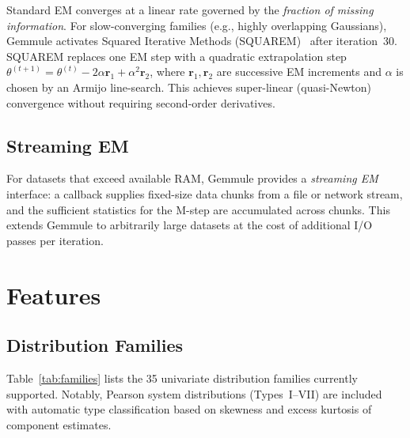 ﻿\documentclass[10pt,twocolumn]{article}
\begin{document}
Standard EM converges at a linear rate governed by the \emph{fraction of
missing information}.
For slow-converging families (e.g., highly overlapping Gaussians),
Gemmule activates Squared Iterative Methods
(SQUAREM)~\citep{varadhan2008squarem} after iteration~30.
SQUAREM replaces one EM step with a quadratic extrapolation step
$\theta^{(t+1)} = \theta^{(t)} - 2\alpha \mathbf{r}_1 + \alpha^2 \mathbf{r}_2$,
where $\mathbf{r}_1, \mathbf{r}_2$ are successive EM increments and
$\alpha$ is chosen by an Armijo line-search.
This achieves super-linear (quasi-Newton) convergence without requiring
second-order derivatives.

\subsection{Streaming EM}

For datasets that exceed available RAM, Gemmule provides a \emph{streaming
EM} interface: a callback supplies fixed-size data chunks from a file or
network stream, and the sufficient statistics for the M-step are accumulated
across chunks.
This extends Gemmule to arbitrarily large datasets at the cost of
additional I/O passes per iteration.

\section{Features}

\subsection{Distribution Families}

Table~\ref{tab:families} lists the 35 univariate distribution families
currently supported.
Notably, Pearson system distributions (Types~I--VII) are included with
automatic type classification based on skewness and excess kurtosis of
component estimates.
\end{document}
